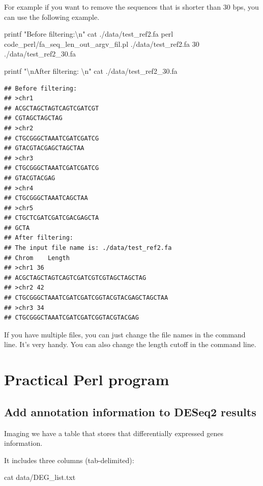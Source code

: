 \documentclass[]{book}
\makeatletter
\newenvironment{Shaded}{\begin{snugshade}}{\end{snugshade}}
\newcommand{\BuiltInTok}[1]{#1}
\newcommand{\FunctionTok}[1]{\textcolor[rgb]{0.00,0.00,0.00}{#1}}
\newcommand{\NormalTok}[1]{#1}
\newcommand{\StringTok}[1]{\textcolor[rgb]{0.31,0.60,0.02}{#1}}
\newenvironment{kframe}{%
\medskip{}
\setlength{\fboxsep}{.8em}
 \def\at@end@of@kframe{}%
 \ifinner\ifhmode%
  \def\at@end@of@kframe{\end{minipage}}%
  \begin{minipage}{\columnwidth}%
 \fi\fi%
 \def\FrameCommand##1{\hskip\@totalleftmargin \hskip-\fboxsep
 \colorbox{shadecolor}{##1}\hskip-\fboxsep
     \hskip-\linewidth \hskip-\@totalleftmargin \hskip\columnwidth}%
 \MakeFramed {\advance\hsize-\width
   \@totalleftmargin\z@ \linewidth\hsize
   \@setminipage}}%
 {\par\unskip\endMakeFramed%
 \at@end@of@kframe}
\renewenvironment{Shaded}{\begin{kframe}}{\end{kframe}}
\makeatother
\begin{document}
For example if you want to remove the sequences that is shorter than 30 bps, you can use the following example.

\begin{Shaded}
\begin{Highlighting}[]
\BuiltInTok{printf} \StringTok{"Before filtering:\textbackslash{}n"}
\FunctionTok{cat}\NormalTok{ ./data/test_ref2.fa}
\FunctionTok{perl}\NormalTok{ code_perl/fa_seq_len_out_argv_fil.pl ./data/test_ref2.fa 30 ./data/test_ref2_30.fa}

\BuiltInTok{printf} \StringTok{"\textbackslash{}nAfter filtering: \textbackslash{}n"}
\FunctionTok{cat}\NormalTok{ ./data/test_ref2_30.fa }
\end{Highlighting}
\end{Shaded}

\begin{verbatim}
## Before filtering:
## >chr1
## ACGCTAGCTAGTCAGTCGATCGT
## CGTAGCTAGCTAG
## >chr2
## CTGCGGGCTAAATCGATCGATCG
## GTACGTACGAGCTAGCTAA
## >chr3
## CTGCGGGCTAAATCGATCGATCG
## GTACGTACGAG
## >chr4
## CTGCGGGCTAAATCAGCTAA
## >chr5
## CTGCTCGATCGATCGACGAGCTA
## GCTA
## After filtering: 
## The input file name is: ./data/test_ref2.fa
## Chrom    Length
## >chr1 36
## ACGCTAGCTAGTCAGTCGATCGTCGTAGCTAGCTAG
## >chr2 42
## CTGCGGGCTAAATCGATCGATCGGTACGTACGAGCTAGCTAA
## >chr3 34
## CTGCGGGCTAAATCGATCGATCGGTACGTACGAG
\end{verbatim}

If you have multiple files, you can just change the file names in the command line. It's very handy. You can also change the length cutoff in the command line.

\hypertarget{practical-perl-program}{%
\chapter{Practical Perl program}\label{practical-perl-program}}

\hypertarget{add-annotation-information-to-deseq2-results}{%
\section{Add annotation information to DESeq2 results}\label{add-annotation-information-to-deseq2-results}}

Imaging we have a table that stores that differentially expressed genes information.

It includes three columns (tab-delimited):

\begin{Shaded}
\begin{Highlighting}[]
\FunctionTok{cat}\NormalTok{ data/DEG_list.txt}
\end{Highlighting}
\end{Shaded}
\end{document}
